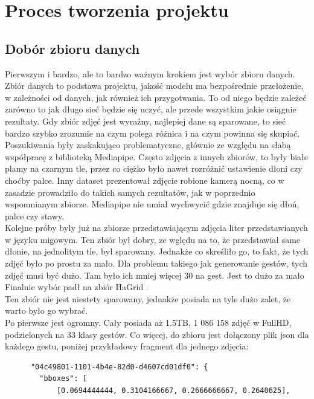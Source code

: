 \documentclass[12pt]{article}
\begin{document}
\begin{sloppypar}
\section{Proces tworzenia projektu}
{
  \subsection{Dobór zbioru danych}
  {
    Pierwszym i bardzo, ale to bardzo ważnym krokiem jest wybór zbioru danych. 
    Zbiór danych to podstawa projektu, jakość modelu ma bezpośrednie przełożenie, w zależności od danych, jak również ich przygotwania. 
    To od niego będzie zależeć zarówno to jak długo sieć będzie się uczyć, ale przede wszystkim jakie osiągnie rezultaty. 
    Gdy zbiór zdjęć jest wyraźny, najlepiej dane są sparowane, to sieć bardzo szybko zrozumie na czym polega różnica i na czym powinna się skupiać. \\
    Poszukiwania były zaskakująco problematyczne, głównie ze względu na słabą współpracę z biblioteką Mediapipe. 
    Często zdjęcia z innych zbiorów, to były białe plamy na czarnym tle, przez co ciężko było nawet rozróżnić ustawienie dłoni czy choćby palce.
    Inny dataset prezentował zdjęcie robione kamerą nocną, co w zasadzie prowadziło do takich samych rezultatów, jak w poprzednio wspomnianym zbiorze.
    Mediapipe nie umiał wychwycić gdzie znajduje się dłoń, palce czy stawy. \\
    Kolejne próby były już na zbiorze przedstawiającym zdjęcia liter przedstawianych w języku migowym. 
    Ten zbiór był dobry, ze wględu na to, że przedstawiał same dłonie, na jednolitym tle, był sparowany. 
    Jednakże co skreśliło go, to fakt, że tych zdjęć było po prostu za mało. 
    Dla problemu takiego jak generowanie gestów, tych zdjęć musi być dużo. Tam było ich mniej więcej 30 na gest. Jest to dużo za mało \\
    Finalnie wybór padł na zbiór HaGrid \cite{nuzhdin2024hagridv21mimagesstatic}. \\
    Ten zbiór nie jest niestety sparowany, jednakże posiada na tyle dużo zalet, że warto było go wybrać. \\
    Po pierwsze jest ogromny. Cały posiada aż 1.5TB, 1 086 158 zdjęć w FullHD, podzielonych na 33 klasy gestów. 
    Co więcej, do zbioru jest dołączony plik json dla każdego gestu, poniżej przykładowy fragment dla jednego zdjęcia:
    \begin{lstlisting}
      "04c49801-1101-4b4e-82d0-d4607cd01df0": {
        "bboxes": [
            [0.0694444444, 0.3104166667, 0.2666666667, 0.2640625],

\end{lstlisting}}}
\end{sloppypar}
\end{document}
